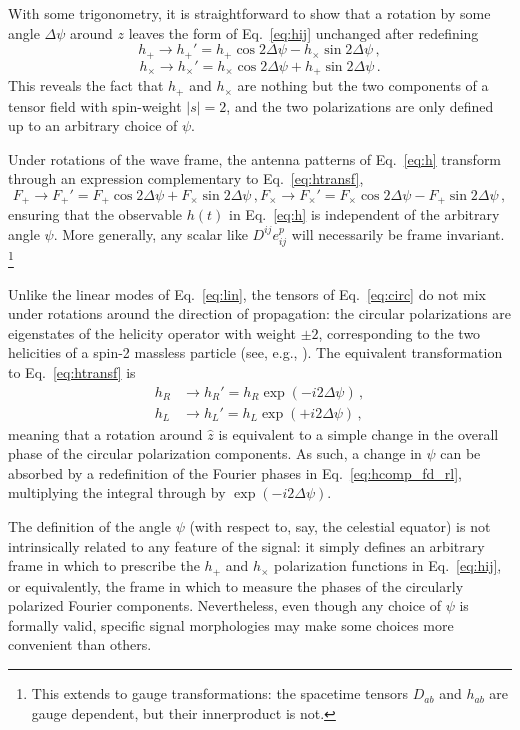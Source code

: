 \documentclass[aps,prd,twocolumn,superscriptaddress,preprintnumbers,floatfix,nofootinbib]{revtex4-2}
\newcommand{\beq}{\begin{equation}}
\newcommand{\eeq}{\end{equation}}
\newcommand*{\eq}[1]{Eq.~\eqref{eq:#1}}
\begin{document}
With some trigonometry, it is straightforward to show that a rotation by some angle $\Delta \psi$ around $z$ leaves the form of \eq{hij} unchanged after redefining
\beq \label{eq:htransf}
h_+ \rightarrow h_+' = h_+ \cos 2\Delta \psi - h_\times \sin 2\Delta\psi \, ,
\eeq
\beq
h_\times \rightarrow h_\times' = h_\times \cos 2\Delta \psi + h_+ \sin 2\Delta\psi \, .
\eeq
This reveals the fact that $h_+$ and $h_\times$ are nothing but the two components of a tensor field with spin-weight $|s|=2$, and the two polarizations are only defined up to an arbitrary choice of $\psi$.

Under rotations of the wave frame, the antenna patterns of \eq{h} transform through an expression complementary to \eq{htransf},
\begin{subequations} \label{eq:Ftransf}
\beq
F_+ \rightarrow F_+' = F_+ \cos 2\Delta \psi + F_\times \sin 2\Delta\psi \, ,
\eeq
\beq
F_\times \rightarrow F_\times' = F_\times \cos 2\Delta \psi - F_+ \sin 2\Delta\psi \, ,
\eeq
\end{subequations}
ensuring that the observable $h(t)$ in \eq{h} is independent of the arbitrary angle $\psi$.
More generally, any scalar like $D^{ij} e^{p}_{ij}$ will necessarily be frame invariant.%
\footnote{This extends to gauge transformations: the spacetime tensors $D_{ab}$ and $h_{ab}$ are gauge dependent, but their innerproduct is not.}

Unlike the linear modes of Eq.~\eqref{eq:lin}, the tensors of Eq.~\eqref{eq:circ} do not mix under rotations around the direction of propagation:
the circular polarizations are eigenstates of the helicity operator with weight $\pm 2$, corresponding to the two helicities of a spin-2 massless particle (see, e.g., \cite{Hinterbichler2011}).
The equivalent transformation to Eq.~\eqref{eq:htransf} is
\begin{subequations} \label{eq:htransf_circ}
\begin{align}
h_R &\rightarrow h_R' = h_R \exp(- i2  \Delta \psi) \, ,\\
h_L &\rightarrow h_L' = h_L \exp(+ i2  \Delta \psi)\, ,
\end{align}
\end{subequations}
meaning that a rotation around $\hat{z}$ is equivalent to a simple change in the overall phase of the circular polarization components.
As such, a change in $\psi$ can be absorbed by a redefinition of the Fourier phases in \eq{hcomp_fd_rl}, multiplying the integral through by $\exp(-i2\Delta\psi)$.

The definition of the angle $\psi$ (with respect to, say, the celestial equator) is not intrinsically related to any feature of the signal: it simply defines an arbitrary frame in which to prescribe the $h_+$ and $h_\times$ polarization functions in \eq{hij}, or equivalently, the frame in which to measure the phases of the circularly polarized Fourier components.
Nevertheless, even though any choice of $\psi$ is formally valid, specific signal morphologies may make some choices more convenient than others.
\end{document}
